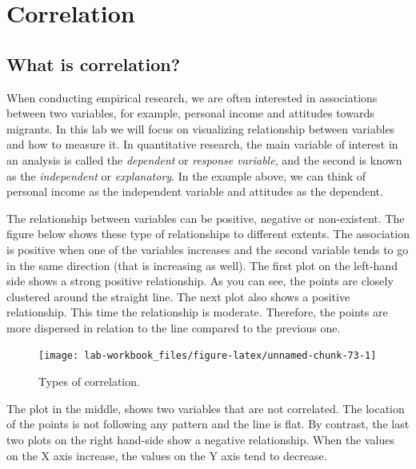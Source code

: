 \documentclass[
]{book}
\begin{document}
\hypertarget{correlation}{%
\chapter{Correlation}\label{correlation}}

\hypertarget{what-is-correlation}{%
\section{What is correlation?}\label{what-is-correlation}}

When conducting empirical research, we are often interested in associations between two variables, for example, personal income and attitudes towards migrants. In this lab we will focus on visualizing relationship between variables and how to measure it. In quantitative research, the main variable of interest in an analysis is called the \emph{dependent} or \emph{response variable}, and the second is known as the \emph{independent} or \emph{explanatory}. In the example above, we can think of personal income as the independent variable and attitudes as the dependent.

The relationship between variables can be positive, negative or non-existent. The figure below shows these type of relationships to different extents. The association is positive when one of the variables increases and the second variable tends to go in the same direction (that is increasing as well). The first plot on the left-hand side shows a strong positive relationship. As you can see, the points are closely clustered around the straight line. The next plot also shows a positive relationship. This time the relationship is moderate. Therefore, the points are more dispersed in relation to the line compared to the previous one.

\begin{figure}

\texttt{[image: lab-workbook\_files/figure-latex/unnamed-chunk-73-1]} \hfill{}

\caption{\label{fig:figs} Types of correlation.}\label{fig:unnamed-chunk-73}
\end{figure}

The plot in the middle, shows two variables that are not correlated. The location of the points is not following any pattern and the line is flat. By contrast, the last two plots on the right hand-side show a negative relationship. When the values on the X axis increase, the values on the Y axis tend to decrease.
\end{document}
